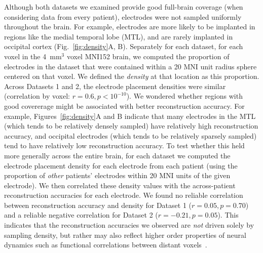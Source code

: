 \documentclass[11pt]{article}
\begin{document}
Although both datasets we examined provide good full-brain coverage (when
considering data from every patient), electrodes were not sampled uniformly
throughout the brain.  For example, electrodes are more likely to be implanted
in regions like the medial temporal lobe (MTL), and are rarely implanted in
occipital cortex (Fig.~\ref{fig:density}A, B). Separately for each dataset, for
each voxel in the 4~mm$^3$ voxel MNI152 brain, we computed the proportion of
electrodes in the dataset that were contained within a 20 MNI unit radius sphere
centered on that voxel.  We defined the \textit{density} at that location as
this proportion. Across Datasets 1 and 2, the electrode placement densities were
similar (correlation by voxel: $r = 0.6, p < 10^{-10}$).  We wondered whether
regions with good covererage might be associated with better reconstruction
accuracy. For example, Figures~\ref{fig:density}A and B indicate that many
electrodes in the MTL (which tends to be relatively densely sampled) have
relatively high reconstruction accuracy, and occipital electrodes (which tends
to be relatively sparsely sampled) tend to have relatively low reconstruction
accuracy.  To test whether this held more generally across the entire brain, for
each dataset we computed the electrode placement density for each electrode from
each patient (using the proportion of \textit{other} patients' electrodes within
20 MNI units of the given electrode).  We then correlated these density values
with the across-patient reconstruction accuracies for each electrode.  We found
no reliable correlation between reconstruction accuracy and density for Dataset
1 ($r = 0.05, p = 0.70$) and a reliable negative correlation for Dataset 2 ($r =
-0.21, p = 0.05$).  This indicates that the reconstruction accuracies we
observed are \textit{not} driven solely by sampling density, but rather may also
reflect higher order properties of neural dynamics such as functional
correlations between distant voxels~\citep{BetzEtal17b}.
\end{document}
